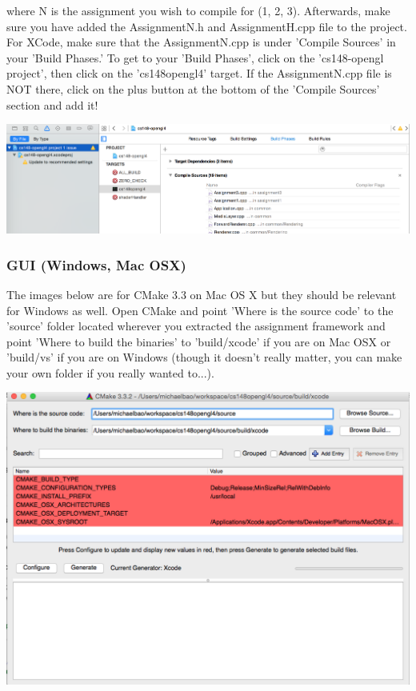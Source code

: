 \documentclass{article}
\begin{document}
where N is the assignment you wish to compile for (1, 2, 3). Afterwards, make sure you have added the AssignmentN.h and AssignmentH.cpp file to the project. For XCode, make sure that the AssignmentN.cpp is under 'Compile Sources' in your 'Build Phases.' To get to your 'Build Phases', click on the 'cs148-opengl project', then click on the 'cs148opengl4' target. If the AssignmentN.cpp file is NOT there, click on the plus button at the bottom of the 'Compile Sources' section and add it!

\includegraphics[width=\linewidth]{xcode4.png}

\subsubsection*{GUI (Windows, Mac OSX)}

The images below are for CMake 3.3 on Mac OS X but they should be relevant for Windows as well. Open CMake and point 'Where is the source code' to the 'source' folder located wherever you extracted the assignment framework and point 'Where to build the binaries' to 'build/xcode' if you are on Mac OSX or 'build/vs' if you are on Windows (though it doesn't really matter, you can make your own folder if you really wanted to...).

\includegraphics[width=\linewidth]{cmake1.png}
\end{document}
